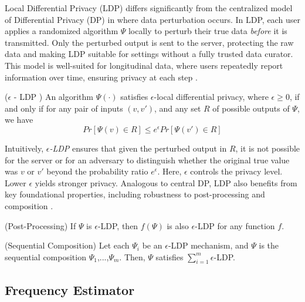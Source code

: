 Local Differential Privacy (LDP) differs significantly from the centralized model of Differential Privacy (DP) \cite{DBLP:conf/icalp/Dwork06} in where data perturbation occurs. In LDP, each user applies a randomized algorithm $\Psi$ locally to perturb their true data \textit{before} it is transmitted. Only the perturbed output is sent to the server, protecting the raw data and making LDP suitable for settings without a fully trusted data curator. This model is well-suited for longitudinal data, where users repeatedly report information over time, ensuring privacy at each step \cite{arcolezi2022improving}. 

\begin{definition}($\epsilon$ - LDP \cite{erlingsson2014rappor}) An algorithm
$\Psi(\cdot)$ satisfies $\epsilon$-local differential privacy, where $\epsilon \geq 0$, if and
only if for any pair of inputs $(v,v')$, and any set $R$ of possible outputs
of $\Psi$, we have
\begin{equation}
Pr[\Psi(v) \in R] \leq e^\epsilon Pr[\Psi(v') \in R]
\end{equation}
\label{def_ldp}
\end{definition} 


Intuitively, $\epsilon$\textit{-LDP} ensures that given the perturbed output in $R$,
it is not possible for the server or for an adversary to
distinguish whether the original true value was $v$ or $v'$ beyond
the probability ratio $e^\epsilon$. Here, $\epsilon$ controls the privacy level. Lower $\epsilon$ yields
stronger privacy. Analogous to central DP, LDP also benefits from key foundational properties, including robustness to post-processing and composition \cite{DBLP:journals/fttcs/DworkR14}.

\begin{proposition}(Post-Processing)
    If $\Psi$ is $\epsilon$-LDP, then $f(\Psi)$ is also $\epsilon$-LDP for any function $f$.
\label{prop:post_processing}
\end{proposition}

\begin{proposition}(Sequential Composition)
     Let each $\Psi_i$ be an $\epsilon$-LDP mechanism, and $\Psi$ is the sequential composition $\Psi_1$,...,$\Psi_m$. Then, $\Psi$ satisfies $\sum_{i=1}^{m}  \epsilon$-LDP.
\label{prop:seq_processing}
\end{proposition}

\subsection{Frequency Estimator}
\label{sec:freq_estimator}

